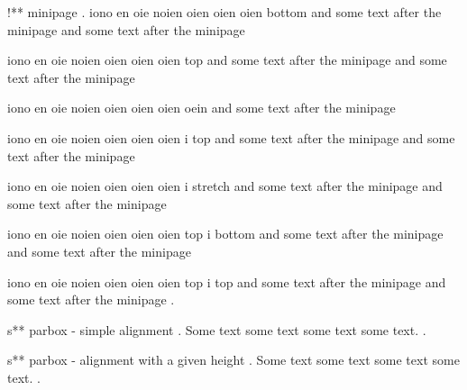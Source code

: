 !** minipage
.
iono en oie noien oien oien oien bottom  and some text after the minipage and some text after the minipage

iono en oie noien oien oien oien top  and some text after the minipage and some text after the minipage


iono en oie noien oien oien oien oein  and some text after the minipage

iono en oie noien oien oien oien i top  and some text after the minipage and some text after the minipage

iono en oie noien oien oien oien i stretch  and some text after the minipage and some text after the minipage

iono en oie noien oien oien oien top i bottom  and some text after the minipage and some text after the minipage

iono en oie noien oien oien oien top i top  and some text after the minipage and some text after the minipage
.


s** parbox - simple alignment
.
\noindent
Some text
some text
some text
some text.
.


s** parbox - alignment with a given height
.
\noindent
Some text
some text
some text
some text.
.


